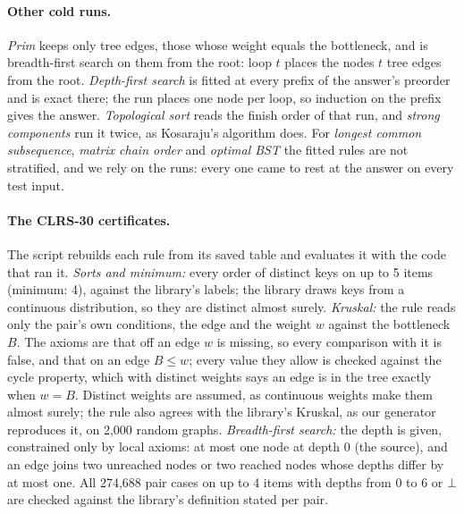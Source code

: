 \documentclass[10pt]{article}
\newcommand{\notyet}{\bot}
\begin{document}
\paragraph{Other cold runs.} \emph{Prim} keeps only tree edges, those whose weight equals the bottleneck, and is
breadth-first search on them from the root: loop $t$ places the nodes $t$ tree edges from the root. \emph{Depth-first
search} is fitted at every prefix of the answer's preorder and is exact there; the run places one node per loop, so
induction on the prefix gives the answer. \emph{Topological sort} reads the finish order of that run, and \emph{strong
components} run it twice, as Kosaraju's algorithm does. For \emph{longest common subsequence}, \emph{matrix chain order}
and \emph{optimal BST} the fitted rules are not stratified, and we rely on the runs: every one came to rest at the
answer on every test input.

\paragraph{The CLRS-30 certificates.} The script rebuilds each rule from its saved table and evaluates it with the code
that ran it. \emph{Sorts and minimum:} every order of distinct keys on up to 5 items (minimum:
4), against the library's labels; the library draws keys from a continuous distribution, so they are
distinct almost surely. \emph{Kruskal:} the rule reads only the pair's own conditions, the edge and the weight $w$ against
the bottleneck $B$. The axioms are that off an edge $w$ is missing, so every comparison with it is false, and that on an
edge $B \leq w$; every value they allow is checked against the cycle property, which with distinct weights says an edge
is in the tree exactly when $w = B$. Distinct weights are assumed, as continuous weights make them almost surely; the
rule also agrees with the library's Kruskal, as our generator reproduces it, on 2,000 random graphs.
\emph{Breadth-first search:} the depth is given, constrained only by local axioms: at most one node at depth $0$ (the
source), and an edge joins two unreached nodes or two reached nodes whose depths differ by at most one. All
274,688 pair cases on up to 4 items with depths from 0 to 6 or $\notyet$ are checked against
the library's definition stated per pair.
\end{document}
